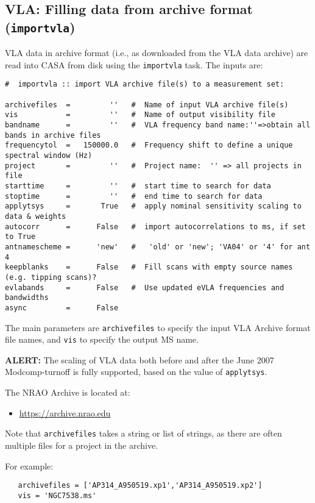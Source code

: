 \subsection{VLA: Filling data from archive format ({\tt importvla})}
\label{section:io.import.vla}

VLA data in archive format (i.e., as downloaded from the VLA data archive)
are read into CASA from disk using the {\tt importvla} task.  The inputs are:
\small
\begin{verbatim}
#  importvla :: import VLA archive file(s) to a measurement set:

archivefiles  =         ''   #  Name of input VLA archive file(s)
vis           =         ''   #  Name of output visibility file
bandname      =         ''   #  VLA frequency band name:''=>obtain all bands in archive files
frequencytol  =   150000.0   #  Frequency shift to define a unique spectral window (Hz)
project       =         ''   #  Project name:  '' => all projects in file
starttime     =         ''   #  start time to search for data
stoptime      =         ''   #  end time to search for data
applytsys     =       True   #  apply nominal sensitivity scaling to data & weights
autocorr      =      False   #  import autocorrelations to ms, if set to True
antnamescheme =      'new'   #   'old' or 'new'; 'VA04' or '4' for ant 4
keepblanks    =      False   #  Fill scans with empty source names (e.g. tipping scans)?
evlabands     =      False   #  Use updated eVLA frequencies and bandwidths
async         =      False        
\end{verbatim}
\normalsize

The main parameters are {\tt archivefiles} to specify the input
VLA Archive format file names, and {\tt vis} to specify the output
MS name. 

{\bf ALERT:} The scaling of VLA data both before and after the
June 2007 Modcomp-turnoff is fully supported, based on the value of
{\tt applytsys}.  

The NRAO Archive is located at:
\begin{itemize}
  \item \url{https://archive.nrao.edu}
\end{itemize}
Note that {\tt archivefiles} takes a string or list of
strings, as there are often multiple files for a project in the
archive.

For example:
\small
\begin{verbatim}
   archivefiles = ['AP314_A950519.xp1','AP314_A950519.xp2']
   vis = 'NGC7538.ms'
\end{verbatim}
\normalsize

